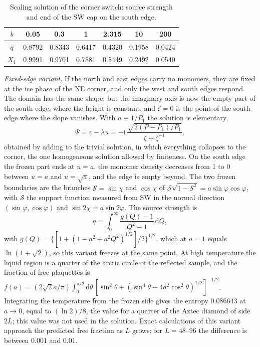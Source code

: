 \documentclass[reprint,aps,prb,floatfix,longbibliography,amsmath,amssymb]{revtex4-2}
\newcommand{\dd}{\mathrm{d}}
\newcommand{\ii}{\mathrm{i}}
\newcommand{\lnt}{\ln(1+\sqrt2)}
\begin{document}
\begin{table}[t]
\caption{\label{tab:caps}Scaling solution of the corner switch: source strength and end of the SW cap on the south edge.}
\begin{ruledtabular}
\begin{tabular}{ccccccc}
$b$ & 0.05 & 0.3 & 1 & 2.315 & 10 & 200 \\
\hline
$q$ & 0.8792 & 0.8343 & 0.6417 & 0.4320 & 0.1958 & 0.0424 \\
$X_1$ & 0.9991 & 0.9701 & 0.7881 & 0.5449 & 0.2492 & 0.0540 \\
\end{tabular}
\end{ruledtabular}
\end{table}

\emph{Fixed-edge variant.} If the north and east edges carry no monomers, they are fixed at the ice phase of the NE corner, and only the west and south edges respond. The domain has the same shape, but the imaginary axis is now the empty part of the south edge, where the height is constant, and $\zeta=0$ is the point of the south edge where the slope vanishes. With $a\equiv1/P_1$ the solution is elementary,
\begin{equation}
  \Psi=v-\lambda u=-\ii\,\frac{\sqrt{2(P-P_1)/P_1}}{\zeta+\zeta^{-1}},
\end{equation}
obtained by adding to the trivial solution, in which everything collapses to the corner, the one homogeneous solution allowed by finiteness. On the south edge the frozen part ends at $u=a$, the monomer density decreases from 1 to 0 between $u=a$ and $u=\sqrt a$, and the edge is empty beyond. The two frozen boundaries are the branches $\mathcal{S}=\sin\chi$ and $\cos\chi$ of $\mathcal{S}\sqrt{1-\mathcal{S}^2}=a\sin\varphi\cos\varphi$, with $\mathcal{S}$ the support function measured from SW in the normal direction $(\sin\varphi,\cos\varphi)$ and $\sin2\chi=a\sin2\varphi$. The source strength is
\begin{equation}
  q=\int_0^\infty\frac{g(Q)-1}{Q^2-1}\,\dd Q,
\end{equation}
with $g(Q)=\{[1+(1-a^2+a^2Q^2)^{1/2}]/2\}^{1/2}$, which at $a=1$ equals $\lnt$, so this variant freezes at the same point. At high temperature the liquid region is a quarter of the arctic circle of the reflected sample, and the fraction of free plaquettes is $f(a)=(2\sqrt2a/\pi)\int_0^{\pi/2}\dd\theta\,[\sin^2\theta+(\sin^4\theta+4a^2\cos^2\theta)^{1/2}]^{-1/2}$. Integrating the temperature from the frozen side gives the entropy $0.086643$ at $a\to0$, equal to $(\ln2)/8$, the value for a quarter of the Aztec diamond of side $2L$; this value was not used in the solution. Exact calculations of this variant approach the predicted free fraction as $L$ grows; for $L=48$--96 the difference is between 0.001 and 0.01.
\end{document}
